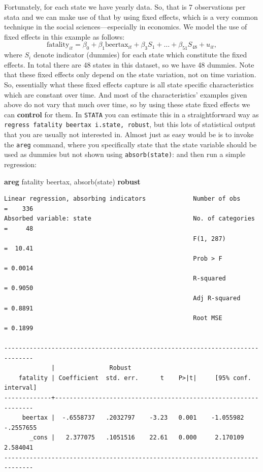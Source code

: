 \documentclass[
]{book}
\newenvironment{Shaded}{\begin{snugshade}}{\end{snugshade}}
\newcommand{\KeywordTok}[1]{\textcolor[rgb]{0.13,0.29,0.53}{\textbf{#1}}}
\newcommand{\NormalTok}[1]{#1}
\begin{document}
Fortunately, for each state we have yearly data. So, that is 7 observations per stata and we can make use of that by using fixed effects, which is a very common technique in the social sciences---especially in economics. We model the use of fixed effects in this example as follows:
\begin{equation}
\text{fatality}_{it} = \beta_0 + \beta_1\text{beertax}_{it} + \beta_3 S_1 + \ldots + \beta_51 S_{48} + u_{it}, 
\end{equation}
where \(S_i\) denote indicator (dummies) for each state which constitute the fixed effects. In total there are 48 states in this dataset, so we have 48 dummies. Note that these fixed effects only depend on the state variation, not on time variation. So, essentially what these fixed effects capture is all state specific characteristics which are constant over time. And most of the characteristics' examples given above do not vary that much over time, so by using these state fixed effects we can \textbf{control} for them. In \texttt{STATA} you can estimate this in a straightforward way as \texttt{regress\ fatality\ beertax\ i.state,\ robust}, but this lots of statistical output that you are usually not interested in. Almost just as easy would be is to invoke the \texttt{areg} command, where you specifically state that the state variable should be used as dummies but not shown using \texttt{absorb(state)}:
and then run a simple regression:

\begin{Shaded}
\begin{Highlighting}[]
\KeywordTok{areg}\NormalTok{ fatality beertax, absorb(state) }\KeywordTok{robust}
\end{Highlighting}
\end{Shaded}

\begin{verbatim}
Linear regression, absorbing indicators             Number of obs     =    336
Absorbed variable: state                            No. of categories =     48
                                                    F(1, 287)         =  10.41
                                                    Prob > F          = 0.0014
                                                    R-squared         = 0.9050
                                                    Adj R-squared     = 0.8891
                                                    Root MSE          = 0.1899

------------------------------------------------------------------------------
             |               Robust
    fatality | Coefficient  std. err.      t    P>|t|     [95% conf. interval]
-------------+----------------------------------------------------------------
     beertax |  -.6558737   .2032797    -3.23   0.001    -1.055982   -.2557655
       _cons |   2.377075   .1051516    22.61   0.000     2.170109    2.584041
------------------------------------------------------------------------------
\end{verbatim}
\end{document}
